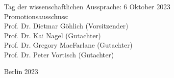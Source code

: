 \begin{flushright}
	\hrulefill

 	Tag der wissenschaftlichen Aussprache: 6 Oktober 2023\\

	\vspace{5mm}
	Promotionsausschuss:\\
	Prof. Dr. Dietmar Göhlich (Vorsitzender)\\
	Prof. Dr. Kai Nagel (Gutachter)\\
	Prof. Dr. Gregory MacFarlane (Gutachter)\\
	Prof. Dr. Peter Vortisch (Gutachter)\\
	\vspace{6mm}

	Berlin 2023\\

\end{flushright}